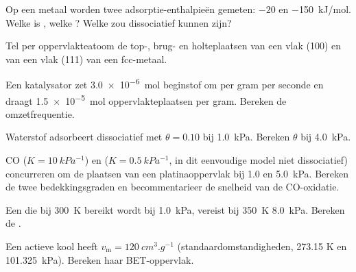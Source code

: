 \begin{exercise}[$\star$]\label{exo:b3:surfaces-catalysis:2}
Op een metaal worden twee adsorptie-enthalpieën gemeten: $-20$ en
\qty{-150}{kJ/mol}. Welke is , welke ? Welke zou
dissociatief kunnen zijn?
\end{exercise}

\begin{exercise}[$\star$]\label{exo:b3:surfaces-catalysis:3}
Tel per oppervlakteatoom de top-, brug- en holteplaatsen van een vlak
(100) en van een vlak (111) van een fcc-metaal.
\end{exercise}

\begin{exercise}[$\star$]\label{exo:b3:surfaces-catalysis:4}
Een katalysator zet \qty{3.0e-6}{mol} beginstof om per gram per seconde en
draagt
\qty{1.5e-5}{mol} oppervlakteplaatsen per gram. Bereken de omzetfrequentie.
\end{exercise}

\begin{exercise}[$\star\star$]\label{exo:b3:surfaces-catalysis:5}
Waterstof adsorbeert dissociatief met $\theta = 0.10$ bij \qty{1.0}{kPa}. Bereken $\theta$ bij \qty{4.0}{kPa}.
\end{exercise}

\begin{exercise}[$\star\star$]\label{exo:b3:surfaces-catalysis:6}
CO ($K = \qty{10}{kPa^{-1}}$) en  ($K = \qty{0.5}{kPa^{-1}}$, in dit eenvoudige model niet dissociatief)
concurreren om de plaatsen van een platinaoppervlak bij 1.0 en
\qty{5.0}{kPa}. Bereken de twee bedekkingsgraden en becommentarieer de
snelheid van de CO-oxidatie.
\end{exercise}

\begin{exercise}[$\star\star$]\label{exo:b3:surfaces-catalysis:7}
Een  die bij \qty{300}{K} bereikt wordt bij \qty{1.0}{kPa},
vereist bij \qty{350}{K} \qty{8.0}{kPa}. Bereken de .
\end{exercise}

\begin{exercise}[$\star\star$]\label{exo:b3:surfaces-catalysis:8}
Een actieve kool heeft $v_{\mathrm m} = \qty{120}{cm^3.g^{-1}}$
(standaardomstandigheden, 273.15 K en
\qty{101.325}{kPa}). Bereken haar BET-oppervlak.
\end{exercise}

